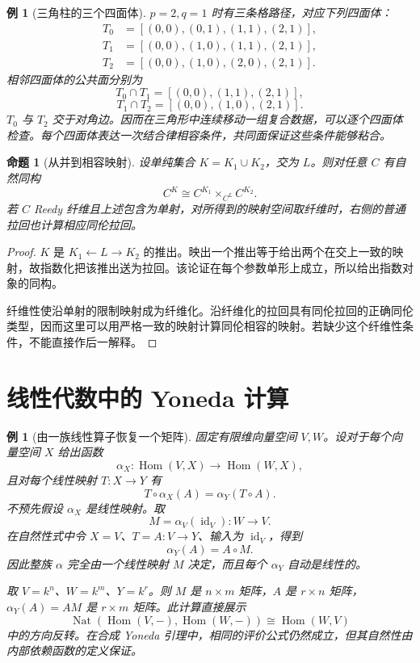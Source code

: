 \documentclass[12pt,oneside,openany,fontset=none]{ctexbook}
\theoremstyle{cn}
\newtheorem{example}[definition]{例}
\newtheorem{proposition}[definition]{命题}
\numberwithin{equation}{chapter}
\newcommand{\id}{\operatorname{id}}
\newcommand{\Hom}{\operatorname{Hom}}
\newcommand{\Nat}{\operatorname{Nat}}
\begin{document}
\begin{example}[三角柱的三个四面体]
$p=2,q=1$ 时有三条格路径，对应下列四面体：
\begin{align*}
 T_0&=[(0,0),(0,1),(1,1),(2,1)],\\
 T_1&=[(0,0),(1,0),(1,1),(2,1)],\\
 T_2&=[(0,0),(1,0),(2,0),(2,1)].
\end{align*}
相邻四面体的公共面分别为
\[
 T_0\cap T_1=[(0,0),(1,1),(2,1)],
\]
\[
 T_1\cap T_2=[(0,0),(1,0),(2,1)].
\]
$T_0$ 与 $T_2$ 交于对角边。因而在三角形中连续移动一组复合数据，可以逐个四面体检查。每个四面体表达一次结合律相容条件，共同面保证这些条件能够粘合。
\end{example}

\begin{proposition}[从并到相容映射]
设单纯集合 $K=K_1\cup K_2$，交为 $L$。则对任意 $C$ 有自然同构
\[
 C^K\cong C^{K_1}\times_{C^L}C^{K_2}.
\]
若 $C$ Reedy 纤维且上述包含为单射，对所得到的映射空间取纤维时，右侧的普通拉回也计算相应同伦拉回。
\end{proposition}
\begin{proof}
$K$ 是 $K_1\leftarrow L\to K_2$ 的推出。映出一个推出等于给出两个在交上一致的映射，故指数化把该推出送为拉回。该论证在每个参数单形上成立，所以给出指数对象的同构。

纤维性使沿单射的限制映射成为纤维化。沿纤维化的拉回具有同伦拉回的正确同伦类型，因而这里可以用严格一致的映射计算同伦相容的映射。若缺少这个纤维性条件，不能直接作后一解释。
\end{proof}

\section{线性代数中的 Yoneda 计算}

\begin{example}[由一族线性算子恢复一个矩阵]
固定有限维向量空间 $V,W$。设对于每个向量空间 $X$ 给出函数
\[
 \alpha_X:\Hom(V,X)\to\Hom(W,X),
\]
且对每个线性映射 $T:X\to Y$ 有
\[
 T\circ\alpha_X(A)=\alpha_Y(T\circ A).
\]
不预先假设 $\alpha_X$ 是线性映射。取
\[
 M=\alpha_V(\id_V):W\to V.
\]
在自然性式中令 $X=V$、$T=A:V\to Y$、输入为 $\id_V$，得到
\[
 \alpha_Y(A)=A\circ M.
\]
因此整族 $\alpha$ 完全由一个线性映射 $M$ 决定，而且每个 $\alpha_Y$ 自动是线性的。

取 $V=k^n$、$W=k^m$、$Y=k^r$。则 $M$ 是 $n\times m$ 矩阵，$A$ 是 $r\times n$ 矩阵，$\alpha_Y(A)=AM$ 是 $r\times m$ 矩阵。此计算直接展示
\[
 \Nat(\Hom(V,-),\Hom(W,-))\cong\Hom(W,V)
\]
中的方向反转。在合成 Yoneda 引理中，相同的评价公式仍然成立，但其自然性由内部依赖函数的定义保证。
\end{example}
\end{document}
